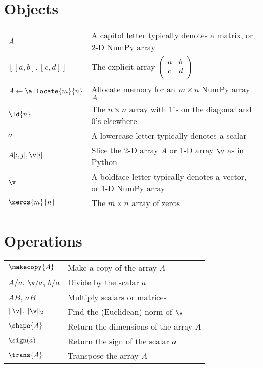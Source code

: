 \label{notation_index}

\section*{Objects}
\renewcommand{\arraystretch}{1.3}
\begin{tabular}{l l}
$A$ 					& A capitol letter typically denotes a matrix, or 2-D NumPy array\\
$[[a, b], [c, d]]$ 			& The explicit array $\left(\begin{array}{cc}
a & b\\
c & d\\\end{array}\right)$\\
$A \gets \allocate{m}{n}$ 	& Allocate memory for an $m \times n$ NumPy array $A$\\
$\Id{n}$	 			& The $n\times n$ array with 1's on the diagonal and 0's elsewhere \\
$a$ 					& A lowercase letter typically denotes a scalar\\

$A[:, j], \v[i]$ 			& Slice the 2-D array $A$ or 1-D array $\v$ as in Python\\
$\v$ 					& A boldface letter typically denotes a vector, or 1-D NumPy array\\
$\zeros{m}{n}$	 		& The $m\times n$ array of zeros 
\end{tabular}

\section*{Operations}
\begin{tabular}{l l}
$\makecopy{A}$		& Make a copy of the array $A$\\
$A/a$, $\v/a$, $b/a$ 		& Divide by the scalar $a$\\
$AB$, $aB$			& Multiply scalars or matrices\\
$\| \v \|, \| \v \|_2$ 		& Find the (Euclidean) norm of $\v$\\
$\shape{A}$			& Return the dimensions of the array $A$\\
$\sign(a)$				& Return the sign of the scalar $a$\\
$\trans{A}$				& Transpose the array $A$
\end{tabular}

